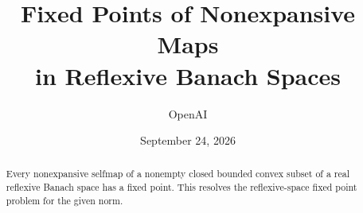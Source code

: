 \documentclass[11pt]{article}
\title{Fixed Points of Nonexpansive Maps\\in Reflexive Banach Spaces}
\author{OpenAI}
\date{September 24, 2026}
\begin{document}
\maketitle
\begin{abstract}
Every nonexpansive selfmap of a nonempty closed bounded convex subset of a real reflexive Banach space has a fixed point. This resolves the reflexive-space fixed point problem for the given norm.
\end{abstract}





\appendix



\end{document}
